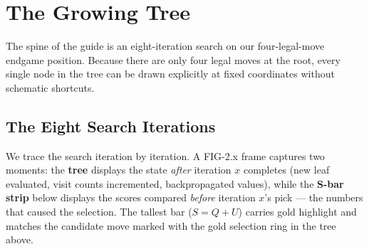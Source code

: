 \chapter{The Growing Tree}
\label{ch:growing_tree}

The spine of the guide is an eight-iteration search on our four-legal-move endgame position. Because there are only four legal moves at the root, every single node in the tree can be drawn explicitly at fixed coordinates without schematic shortcuts.

\section{The Eight Search Iterations}

We trace the search iteration by iteration. A FIG-2.x frame captures two moments: the \textbf{tree} displays the state \textit{after} iteration $x$ completes (new leaf evaluated, visit counts incremented, backpropagated values), while the \textbf{S-bar strip} below displays the scores compared \textit{before} iteration $x$'s pick --- the numbers that caused the selection. The tallest bar ($S = Q + U$) carries gold highlight and matches the candidate move marked with the gold selection ring in the tree above.

\begin{realdata}[Iteration 0]
\begin{center}

\label{fig:2_0}
\end{center}
\end{realdata}

\vspace{1ex}

\begin{realdata}[Iteration 1]
\begin{center}

\label{fig:2_1}
\end{center}
\end{realdata}
\clearpage

\begin{realdata}[Iteration 2]
\begin{center}

\label{fig:2_2}
\end{center}
\end{realdata}

